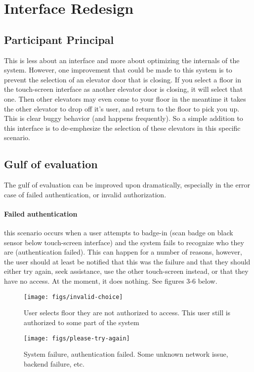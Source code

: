 \section{Interface Redesign}

\subsection{Participant Principal}
This is less about an interface and more about optimizing the internals of the system. However, one  improvement that could be made to this system is to prevent the selection of an elevator door that is closing. If you select a floor in the touch-screen interface as another elevator door is closing, it will select that one. Then other elevators may even come to your floor in the meantime it takes the other elevator to drop off it's user, and return to the floor to pick you up. This is clear buggy behavior (and happens frequently). So a simple addition to this interface is to de-emphesize the selection of these elevators in this specific scenario.

\subsection{Gulf of evaluation}
The gulf of evaluation can be improved upon dramatically, especially in the error case of failed authentication, or invalid authorization.

\paragraph{Failed authentication} this scenario occurs when a user attempts to badge-in (scan badge on black sensor below touch-screen interface) and the system fails to recognize who they are (authentication failed). This can happen for a number of reasons, however, the user should at least be notified that this was the failure and that they should either try again, seek assistance, use the other touch-screen instead, or that they have no access. At the moment, it does nothing. See figures 3-6 below.

\begin{figure}[H]
  \centering
  \texttt{[image: figs/invalid-choice]}
  \caption{User selects floor they are not authorized to access. This user still is authorized to some part of the system}
  \label{fig::1}
\end{figure}

\begin{figure}[H]
  \centering
  \texttt{[image: figs/please-try-again]}
  \caption{System failure, authentication failed. Some unknown network issue, backend failure, etc.}
  \label{fig::1}
\end{figure}


